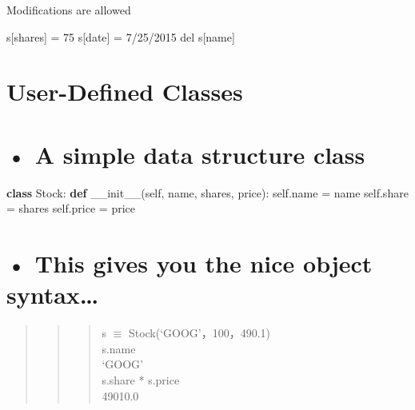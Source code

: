 \documentclass[
  letterpaper,
  DIV=11,
  numbers=noendperiod]{scrreprt}
\newenvironment{Shaded}{\begin{snugshade}}{\end{snugshade}}
\newcommand{\FunctionTok}[1]{\textcolor[rgb]{0.28,0.35,0.67}{#1}}
\newcommand{\KeywordTok}[1]{\textcolor[rgb]{0.00,0.23,0.31}{\textbf{#1}}}
\newcommand{\NormalTok}[1]{\textcolor[rgb]{0.00,0.23,0.31}{#1}}
\newcommand{\OperatorTok}[1]{\textcolor[rgb]{0.37,0.37,0.37}{#1}}
\newcommand{\VariableTok}[1]{\textcolor[rgb]{0.07,0.07,0.07}{#1}}
\begin{document}
Modifications are allowed

\begin{Shaded}
\begin{Highlighting}[]
\NormalTok{s[\textquotesingle{}shares\textquotesingle{}] = 75  }
\NormalTok{s[\textquotesingle{}date\textquotesingle{}] = \textquotesingle{}7/25/2015\textquotesingle{}  }
\NormalTok{del s[\textquotesingle{}name\textquotesingle{}] }
\end{Highlighting}
\end{Shaded}


\chapter{User-Defined Classes}\label{user-defined-classes}


\chapter{• A simple data structure
class}\label{a-simple-data-structure-class}

\begin{Shaded}
\begin{Highlighting}[]
\KeywordTok{class}\NormalTok{ Stock: }\KeywordTok{def} \FunctionTok{\_\_init\_\_}\NormalTok{(}\VariableTok{self}\NormalTok{, name, shares, price): }\VariableTok{self}\NormalTok{.name }\OperatorTok{=}\NormalTok{ name }\VariableTok{self}\NormalTok{.share }\OperatorTok{=}\NormalTok{ shares }\VariableTok{self}\NormalTok{.price }\OperatorTok{=}\NormalTok{ price }
\end{Highlighting}
\end{Shaded}


\chapter{• This gives you the nice object
syntax\ldots{}}\label{this-gives-you-the-nice-object-syntax}

\begin{quote}
\begin{quote}
\begin{quote}
s \(\equiv\) Stock(`GOOG'，100，490.1)\\
s.name\\
`GOOG'\\
s.share * s.price\\
49010.0
\end{quote}
\end{quote}
\end{quote}
\end{document}
